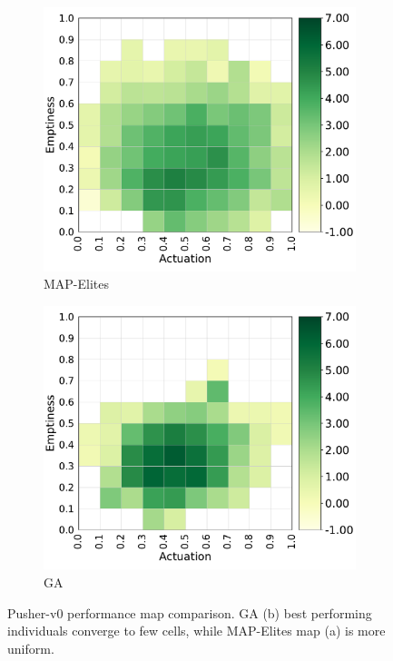 \begin{figure}[H]
    \centering
    \begin{subfigure}[b]{0.49\textwidth}
         \centering
         \includegraphics[scale=0.45]{images/brain_opt/pusher/pusher_qd_pg}
         \caption{MAP-Elites}
    \end{subfigure}
    \hfill
    \begin{subfigure}[b]{0.49\textwidth}
         \centering
         \includegraphics[scale=0.45]{images/brain_opt/pusher/pusher_ga_pg}
         \caption{GA}
    \end{subfigure}
    \caption{Pusher-v0 performance map comparison. GA (b) best performing individuals converge to few cells, while MAP-Elites map (a) is more uniform.}
    \label{fig:qd_ga_pusher_pg}
\end{figure}

